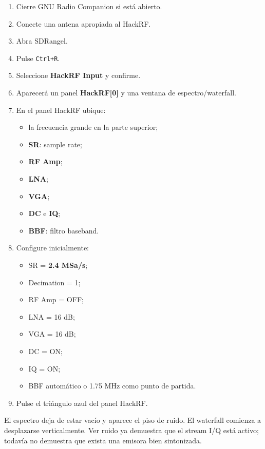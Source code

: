 \begin{enumerate}
    \item Cierre GNU Radio Companion si está abierto.
    \item Conecte una antena apropiada al HackRF.
    \item Abra SDRangel.
    \item Pulse \texttt{Ctrl+R}.
    \item Seleccione \textbf{HackRF Input} y confirme.
    \item Aparecerá un panel \textbf{HackRF[0]} y una ventana de espectro/waterfall.
    \item En el panel HackRF ubique:
    \begin{itemize}
        \item la frecuencia grande en la parte superior;
        \item \textbf{SR}: sample rate;
        \item \textbf{RF Amp};
        \item \textbf{LNA};
        \item \textbf{VGA};
        \item \textbf{DC} e \textbf{IQ};
        \item \textbf{BBF}: filtro baseband.
    \end{itemize}
    \item Configure inicialmente:
    \begin{itemize}
        \item SR = \textbf{2.4 MSa/s};
        \item Decimation = 1;
        \item RF Amp = OFF;
        \item LNA = 16 dB;
        \item VGA = 16 dB;
        \item DC = ON;
        \item IQ = ON;
        \item BBF automático o 1.75 MHz como punto de partida.
    \end{itemize}
    \item Pulse el triángulo azul del panel HackRF.
\end{enumerate}

\begin{esperado}
El espectro deja de estar vacío y aparece el piso de ruido. El waterfall comienza a desplazarse verticalmente. Ver ruido ya demuestra que el stream I/Q está activo; todavía no demuestra que exista una emisora bien sintonizada.
\end{esperado}

